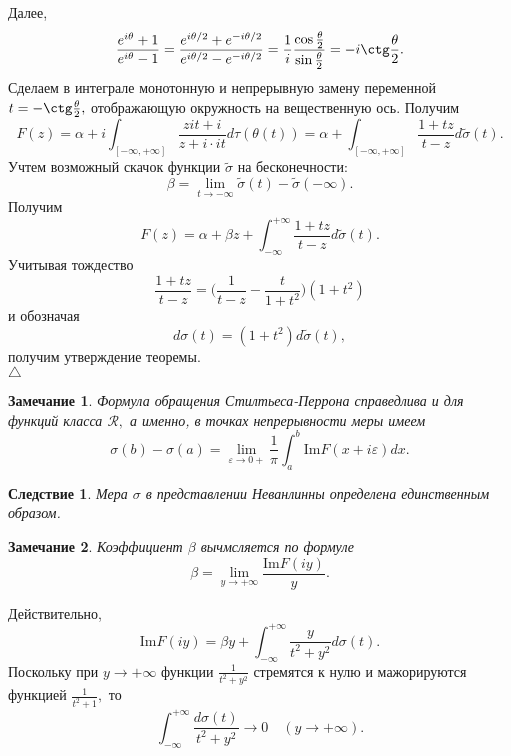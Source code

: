 \documentclass[12 pt, a4 paper]{article}
\theoremstyle{plain}   \newtheorem{Pro}{Задача}
\newtheorem{Rem}{Замечание}
\newtheorem{Cor}{Следствие}
\begin{document}
Далее,
$$
  \frac{e^{i\theta}+1}{e^{i\theta}-1}=
  \frac{e^{i\theta /2}+e^{-i\theta /2}}
  {e^{i\theta /2}-e^{-i\theta /2}}=
  \frac{1}{i}\frac{\cos \frac{\theta}{2}}
  {\sin \frac{\theta}{2}}=
  -i\ctg \frac{\theta}{2}.
$$
Сделаем в интеграле монотонную и непрерывную замену переменной
$ t=-\ctg \frac{\theta}{2} , $
отображающую окружность на вещественную ось. Получим
$$
  F(z)=\alpha +i \int _{[-\infty , +\infty ]}
  \frac{zit+i}{z+i \cdot it}d\tau (\theta (t))=
  \alpha +\int _{[-\infty , +\infty ]}
  \frac{1+tz}{t-z}d \tilde \sigma (t).
$$
Учтем возможный скачок функции
$ \tilde \sigma $
на бесконечности:
$$
  \beta = \lim _{t \rightarrow -\infty}
  \tilde \sigma (t) - \tilde \sigma (-\infty ).
$$
Получим
$$
  F(z)=\alpha +\beta z + \int _{-\infty}^{+\infty}
  \frac{1+tz}{t-z} d \tilde \sigma (t).
$$
Учитывая тождество
$$
  \frac{1+tz}{t-z}=
  \biggl ( \frac{1}{t-z}-\frac{t}{1+t^2} \biggr )
  (1+t^2 )
$$
и обозначая
$$
  d \sigma (t)=(1+t^2 )d \tilde \sigma (t),
$$
получим утверждение теоремы.
\\
$ \triangle $
\begin{Rem}
Формула обращения Стилтьеса-Перрона справедлива и для функций класса
$ \mathcal{R} , $
а именно, в точках непрерывности меры имеем
$$
  \sigma (b)-\sigma (a)=\lim _{\varepsilon \rightarrow 0+}
  \frac{1}{\pi}\int _a ^b \mathrm{Im} F(x+i \varepsilon )dx.
$$
\end{Rem}
\begin{Cor}
Мера
$ \sigma $
в представлении Неванлинны определена единственным образом.
\end{Cor}
\begin{Rem}
Коэффициент
$ \beta $
вычмсляется по формуле
$$
  \beta = \lim _{y \rightarrow +\infty}
  \frac{\mathrm{Im} F(iy)}{y}.
$$
\end{Rem}
Действительно,
$$
  \mathrm{Im} F(iy) = \beta y + \int _{-\infty}^{+\infty}
  \frac{y}{t^2 +y^2}d \sigma (t).
$$
Поскольку при
$ y \rightarrow +\infty $
функции
$ \frac{1}{t^2 +y^2} $
стремятся к нулю и мажорируются функцией
$ \frac{1}{t^2 +1}, $
то
$$
  \int _{-\infty}^{+\infty}
  \frac{d\sigma (t)}{t^2 +y^2} \rightarrow 0
  \quad (y \rightarrow +\infty ).
$$
\\
\end{document}
